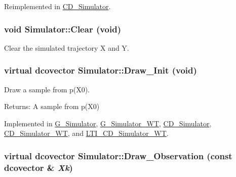 Reimplemented in \hyperlink{class_c_d___simulator_efc4b4521a9d4cd6658c16feb9233e14}{CD\_\-Simulator}.\hypertarget{class_simulator_7f2f4f851a59b2e566692926c3a87940}{
\subsubsection[{Clear}]{\setlength{\rightskip}{0pt plus 5cm}void Simulator::Clear (void)}}
\label{class_simulator_7f2f4f851a59b2e566692926c3a87940}


Clear the simulated trajectory X and Y. 

\hypertarget{class_simulator_29b9603eb2be9139972816329e8663dc}{
\subsubsection[{Draw\_\-Init}]{\setlength{\rightskip}{0pt plus 5cm}virtual dcovector Simulator::Draw\_\-Init (void)}}
\label{class_simulator_29b9603eb2be9139972816329e8663dc}


Draw a sample from p(X0). 

\begin{Desc}
\item[Returns:]A sample from p(X0) \end{Desc}


Implemented in \hyperlink{class_g___simulator_0e9a1d220c5457cc07c6bcdb70e1638c}{G\_\-Simulator}, \hyperlink{class_g___simulator___w_t_4dab061e25ad9b7b6c279d65ea3038d2}{G\_\-Simulator\_\-WT}, \hyperlink{class_c_d___simulator_cbdbea3e487026be0c032d2218d27b2b}{CD\_\-Simulator}, \hyperlink{class_c_d___simulator___w_t_c05069bbef8e4ff83247f77476b2afe1}{CD\_\-Simulator\_\-WT}, and \hyperlink{class_l_t_i___c_d___simulator___w_t_a63eaac608a5f214468dc13d34f8f20f}{LTI\_\-CD\_\-Simulator\_\-WT}.\hypertarget{class_simulator_2fb966c2c2a4c93bb6788e15563c9006}{
\subsubsection[{Draw\_\-Observation}]{\setlength{\rightskip}{0pt plus 5cm}virtual dcovector Simulator::Draw\_\-Observation (const dcovector \& {\em Xk})}}
\label{class_simulator_2fb966c2c2a4c93bb6788e15563c9006}


